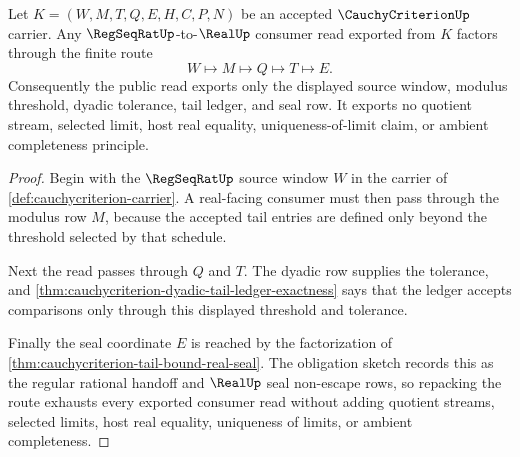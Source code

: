 \begin{theorem}
\label{thm:cauchycriterion-regseqrat-handoff-exhaustion}
Let $K=(W,M,T,Q,E,H,C,P,N)$ be an accepted $\CauchyCriterionUp$ carrier. Any $\RegSeqRatUp$-to-$\RealUp$ consumer read exported from $K$ factors through the finite route
$$
W \longmapsto M \longmapsto Q \longmapsto T \longmapsto E.
$$
Consequently the public read exports only the displayed source window, modulus threshold, dyadic tolerance, tail ledger, and seal row. It exports no quotient stream, selected limit, host real equality, uniqueness-of-limit claim, or ambient completeness principle.
\end{theorem}
\begin{proof}
Begin with the $\RegSeqRatUp$ source window $W$ in the carrier of \autoref{def:cauchycriterion-carrier}. A real-facing consumer must then pass through the modulus row $M$, because the accepted tail entries are defined only beyond the threshold selected by that schedule.

Next the read passes through $Q$ and $T$. The dyadic row supplies the tolerance, and \autoref{thm:cauchycriterion-dyadic-tail-ledger-exactness} says that the ledger accepts comparisons only through this displayed threshold and tolerance.

Finally the seal coordinate $E$ is reached by the factorization of \autoref{thm:cauchycriterion-tail-bound-real-seal}. The obligation sketch records this as the regular rational handoff and $\RealUp$ seal non-escape rows, so repacking the route exhausts every exported consumer read without adding quotient streams, selected limits, host real equality, uniqueness of limits, or ambient completeness.
\end{proof}


